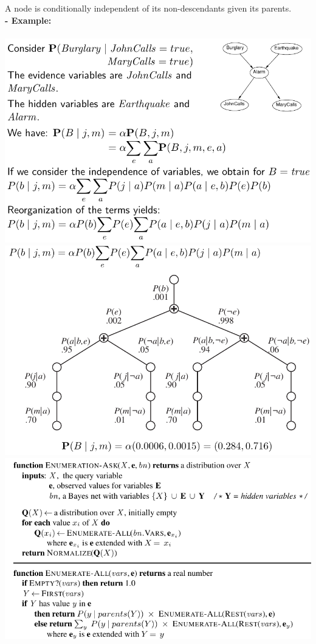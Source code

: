 \documentclass{article}
\begin{document}
A node is conditionally independent of its non-descendants given its parents.\\
\textbf{- Example: }\\\\
\includegraphics[scale=0.3]{72.png}
\includegraphics[scale=0.3]{73.png}\\
\includegraphics[scale=0.3]{74.png}\\\\
\end{document}
